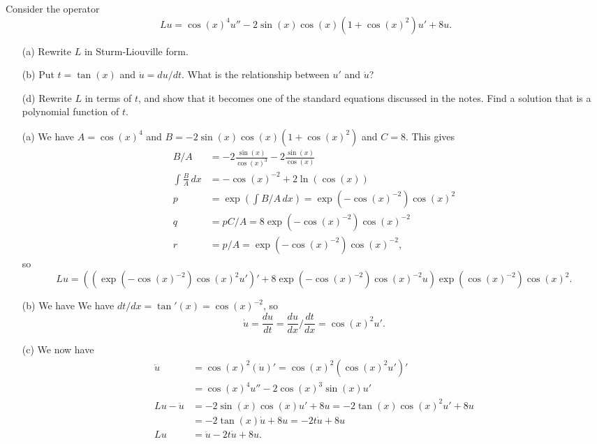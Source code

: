 \documentclass[a4paper]{amsart}
\begin{document}
\begin{exercise}\label{ex-sturm-b}
 Consider the operator 
 \[ Lu = \cos(x)^4 u'' - 2\sin(x)\cos(x)(1+\cos(x)^2)u' +8 u. \]
 \begin{itemize}
  \item[(a)] Rewrite $L$ in Sturm-Liouville form.
  \item[(b)] Put $t=\tan(x)$ and $\dot{u}=du/dt$.  What is the
   relationship between $u'$ and $\dot{u}$?
  \item[(d)] Rewrite $L$ in terms of $t$, and show that it becomes one
   of the standard equations discussed in the notes.  Find a solution
   that is a polynomial function of $t$.
 \end{itemize}
\end{exercise}
\begin{solution}
 \begin{itemize}
  \item[(a)] We have $A=\cos(x)^4$ and
   $B=-2\sin(x)\cos(x)(1+\cos(x)^2)$ and $C=8$.  This gives 
   \begin{align*}
    B/A &= -2 \frac{\sin(x)}{\cos(x)^3}
           -2 \frac{\sin(x)}{\cos(x)} \\
    \int \frac{B}{A}\,dx &= 
     -\cos(x)^{-2} +2\ln(\cos(x)) \\
    p &= \exp\left(\int B/A\,dx\right) 
       = \exp(-\cos(x)^{-2}) \cos(x)^2 \\ 
    q &= pC/A = 8\exp(-\cos(x)^{-2}) \cos(x)^{-2} \\
    r &= p/A = \exp(-\cos(x)^{-2}) \cos(x)^{-2},
   \end{align*}
   so
   \[ Lu = \left((\exp(-\cos(x)^{-2}) \cos(x)^2 u')' +
            8\exp(-\cos(x)^{-2}) \cos(x)^{-2} u\right)
             \exp(\cos(x)^{-2}) \cos(x)^2.
   \]
  \item[(b)] We have 
   We have $dt/dx=\tan'(x)=\cos(x)^{-2}$, so
   \[ \dot{u} = \frac{du}{dt} = \frac{du}{dx}/\frac{dt}{dx} =
       \cos(x)^2u'.
   \]
  \item[(c)] 
   We now have 
   \begin{align*}
    \ddot{u} &= \cos(x)^2 (\dot{u})'
              = \cos(x)^2 (\cos(x)^2u')' \\
     &= \cos(x)^4u'' - 2\cos(x)^3\sin(x)u' \\
    Lu - \ddot{u} &= -2\sin(x)\cos(x)u' + 8u 
      = -2\tan(x)\cos(x)^2u' + 8u \\
      &= -2\tan(x)\dot{u}+8u = -2t\dot{u}+8u \\
    Lu &= \ddot{u}-2t\dot{u}+8u.
   \end{align*}

\end{itemize}
\end{solution}
\end{document}
